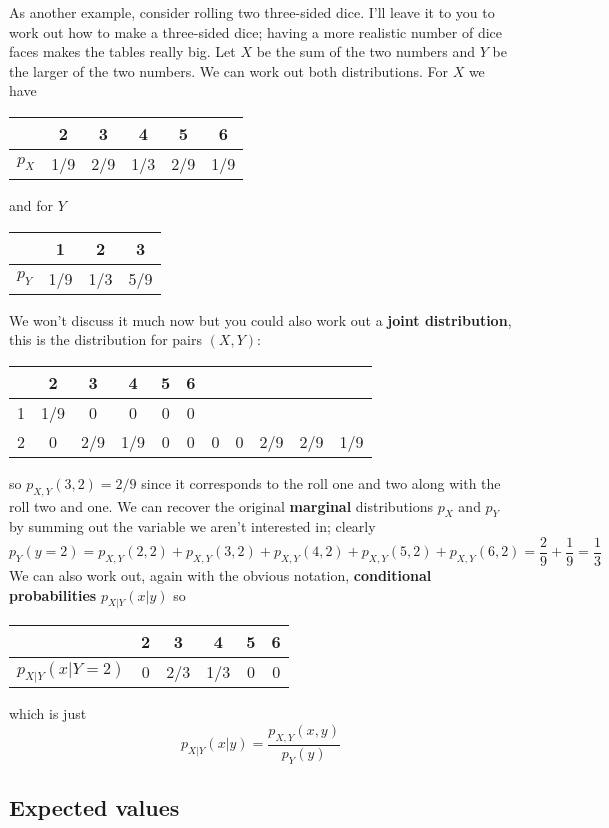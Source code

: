 \documentclass[11pt,a4paper]{scrartcl}
\begin{document}
As another example, consider rolling two three-sided dice. I'll leave
it to you to work out how to make a three-sided dice; having a more
realistic number of dice faces makes the tables really big. Let $X$ be
the sum of the two numbers and $Y$ be the larger of the two
numbers. We can work out both distributions. For $X$ we have
\begin{center}
\begin{tabular}{c|ccccc}
&2&3&4&5&6\\
\hline
$p_X$&1/9&2/9&1/3&2/9&1/9
\end{tabular}
\end{center}
and for $Y$
\begin{center}
\begin{tabular}{c|ccc}
&1&2&3\\
\hline
$p_Y$&1/9&1/3&5/9
\end{tabular}
\end{center}
We won't discuss it much now but you could also work out a
\textbf{joint distribution}, this is the distribution for pairs
$(X,Y)$:
\begin{center}
\begin{tabular}{c|ccccc}
&2&3&4&5&6\\
&  1/9&0&0&0&0\\
2&  0&2/9&1/9&0&0&  0&0&2/9&2/9&1/9
\end{tabular}
\end{center}
so $p_{X,Y}(3,2)=2/9$ since it corresponds to the roll one and two
along with the roll two and one. We can recover the original
\textbf{marginal} distributions $p_X$ and $p_Y$ by summing out the
variable we aren't interested in; clearly
\begin{equation}
p_Y(y=2)=p_{X,Y}(2,2)+p_{X,Y}(3,2)+p_{X,Y}(4,2)+p_{X,Y}(5,2)+p_{X,Y}(6,2)=\frac{2}{9}+\frac{1}{9}=\frac{1}{3}
\end{equation}
We can also work out, again with the obvious notation,
\textbf{conditional probabilities} $p_{X|Y}(x|y)$ so
\begin{center}
\begin{tabular}{c|ccccc}
&2&3&4&5&6\\
\hline
$p_{X|Y}(x|Y=2)$&0&2/3&1/3&0&0
\end{tabular}
\end{center}
which is just
\begin{equation}
p_{X|Y}(x|y)=\frac{p_{X,Y}(x,y)}{p_Y(y)}
\end{equation}

\subsection*{Expected values}
\end{document}

